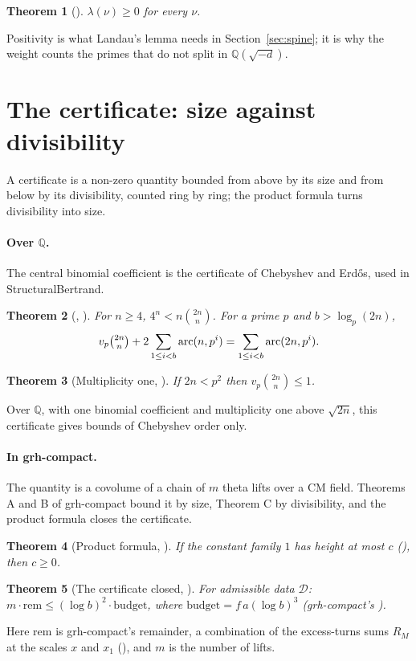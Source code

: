 \documentclass[11pt]{article}
\newtheorem{theorem}{Theorem}[section]
\theoremstyle{definition}
\theoremstyle{remark}
\begin{document}
\begin{theorem}[]
$\lambda(\nu)\ge0$ for every $\nu$.
\end{theorem}
Positivity is what Landau's lemma needs in Section~\ref{sec:spine}; it is why the weight counts the
primes that do not split in $\mathbb Q(\sqrt{-d})$.

\section{The certificate: size against divisibility}\label{sec:certificate}

A certificate is a non-zero quantity bounded from above by its size and from below by its
divisibility, counted ring by ring; the product formula turns divisibility into size.

\paragraph{Over $\mathbb Q$.} The central binomial coefficient is the certificate of Chebyshev and
Erdős, used in StructuralBertrand.
\begin{theorem}[, ]
For $n\ge4$, $4^n<n\binom{2n}{n}$. For a prime $p$ and $b>\log_p(2n)$,
\[
v_p\tbinom{2n}{n}+2\sum_{1\le i<b}\operatorname{arc}(n,p^i)=\sum_{1\le i<b}\operatorname{arc}(2n,p^i).
\]
\end{theorem}
\begin{theorem}[Multiplicity one, ]
If $2n<p^2$ then $v_p\binom{2n}{n}\le1$.
\end{theorem}
Over $\mathbb Q$, with one binomial coefficient and multiplicity one above $\sqrt{2n}$, this
certificate gives bounds of Chebyshev order only.

\paragraph{In grh-compact.} The quantity is a covolume of a chain of $m$ theta lifts over a CM
field. Theorems A and B of grh-compact bound it by size, Theorem C by divisibility, and the product
formula closes the certificate.
\begin{theorem}[Product formula, ]
If the constant family $1$ has height at most $c$ (), then $c\ge0$.
\end{theorem}
\begin{theorem}[The certificate closed, ]
For admissible data $\mathcal D$: $m\cdot\mathrm{rem}\le(\log b)^2\cdot\mathrm{budget}$, where
$\mathrm{budget}=f\,a(\log b)^3$ (grh-compact's ).
\end{theorem}
Here $\mathrm{rem}$ is grh-compact's remainder, a combination of the excess-turns sums $R_M$ at the
scales $x$ and $x_1$ (), and $m$ is the number of lifts.
\end{document}

